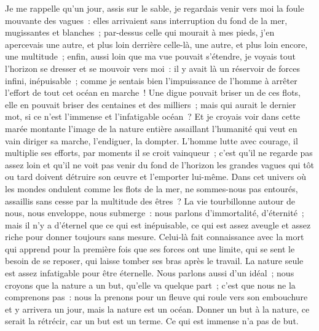 \documentclass[french,twoside]{book} %
\begin{document}
Je me rappelle qu’un jour, assis sur le sable, je regardais venir vers moi la foule mouvante des vagues : elles arrivaient sans interruption du fond de la mer, mugissantes et blanches ; par-dessus celle qui mourait à mes pieds, j’en apercevais une autre, et plus loin derrière celle-là, une autre, et plus loin encore, une multitude ; enfin, aussi loin que ma vue pouvait s’étendre, je voyais tout l’horizon se dresser et se mouvoir vers moi : il y avait là un réservoir de forces infini, inépuisable ; comme je sentais bien l’impuissance de l’homme à arrêter l’effort de tout cet océan en marche ! Une digue pouvait briser un de ces flots, elle en pouvait briser des centaines et des milliers ; mais qui aurait le dernier mot, si ce n’est l’immense et l’infatigable océan ? Et je croyais voir dans cette marée montante l’image de la nature entière assaillant l’humanité qui veut en vain diriger sa marche, l’endiguer, la dompter. L’homme lutte avec courage, il multiplie ses efforts, par moments il se croit vainqueur ; c’est qu’il ne regarde pas assez loin et qu’il ne voit pas venir du fond de l’horizon les grandes vagues qui tôt ou tard doivent détruire son œuvre et l’emporter lui-même. Dans cet univers où les mondes ondulent comme les flots de la mer, ne sommes-nous pas entourés, assaillis sans cesse par la multitude des êtres ? La vie tourbillonne autour de nous, nous enveloppe, nous submerge : nous parlons d’immortalité, d’éternité ; mais il n’y a d’éternel que ce qui est inépuisable, ce qui est assez aveugle et assez riche pour donner toujours sans mesure. Celui-là fait connaissance avec la mort qui apprend pour la première fois que ses forces ont une limite, qui se sent le besoin de se reposer, qui laisse tomber ses bras après le travail. La nature seule est assez infatigable pour être éternelle. Nous parlons aussi d’un idéal ; nous croyons que la nature a un but, qu’elle va quelque part ; c’est que nous ne la comprenons pas : nous la prenons pour un fleuve qui roule vers son embouchure et y arrivera un jour, mais la nature est un océan. Donner un but à la nature, ce serait la rétrécir, car un but est un terme. Ce qui est immense n’a pas de but.\par
\end{document}
